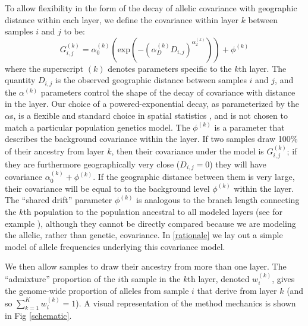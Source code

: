 \documentclass[10pt,letterpaper]{article}
\begin{document}
To allow flexibility in the form of the decay of allelic covariance with geographic distance within each layer, 
we define the covariance within layer $k$ between samples $i$ and $j$ to be:
\begin{equation}
G^{(k)}_{i,j} 
    = 
    \alpha^{(k)}_0 \left( \text{exp} \left( -(\alpha^{(k)}_D D_{i,j}) ^ {\alpha^{(k)}_2}	\right) \right) + \phi^{(k)}
\label{within_layer_covariance}
\end{equation}
where the superscript $(k)$ denotes parameters specific to the $k$th layer.
The quantity $D_{i,j}$ is the observed geographic distance between samples $i$ and $j$,
and the $\alpha^{(k)}$ parameters control the shape of the decay of
covariance with distance in the layer.
Our choice of a powered-exponential decay, 
as parameterized by the $\alpha$s, 
is a flexible and standard choice in spatial statistics \cite{Diggle1998}, 
and is not chosen to match a particular population genetics model. 
The $\phi^{(k)}$ is a parameter that describes the background covariance within the layer. 
If two samples draw 100\% of their ancestry from layer $k$, then their covariance under the model is $G^{(k)}_{i,j}$;
if they are furthermore geographically very close ($D_{i,j}=0$)
they will have covariance $\alpha^{(k)}_0 +  \phi^{(k)}$.
If the geographic distance between them is very large, 
their covariance will be equal to to the background level $\phi^{(k)}$ within the layer.
The ``shared drift'' parameter $\phi^{(k)}$ is analogous to 
the branch length connecting the $k$th population to the population ancestral to all modeled
layers (see for example \cite{patterson_ancient_2012,peter_fstats}),
although they cannot be directly compared because 
we are modeling the allelic, rather than genetic, covariance. 
In \ref{rationale} we lay out a
simple model of allele frequencies underlying this covariance model.

We then allow samples to draw their ancestry from more than one layer.
The ``admixture'' proportion of the $i$th sample in the $k$th layer, denoted $w^{(k)}_i$,
gives the genome-wide proportion of alleles from sample $i$ that derive from
layer 
$k$ (and so $\sum_{k=1}^K w^{(k)}_i =1$).
A visual representation of the method mechanics is shown in Fig \ref{schematic}.
\end{document}
